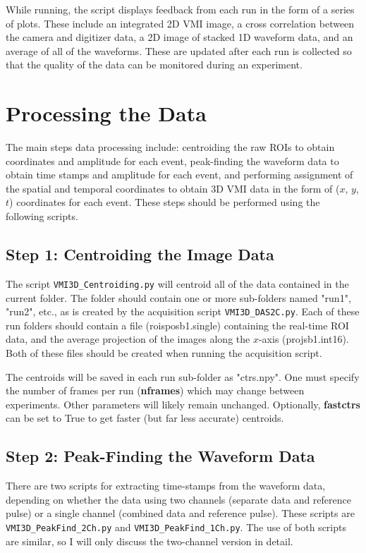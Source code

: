 \documentclass[12pt]{article}
\begin{document}
While running, the script displays feedback from each run in the form of a series of plots.
These include an integrated 2D VMI image, a cross correlation between the camera and digitizer data, a 2D image of stacked 1D waveform data, and an average of all of the waveforms.
These are updated after each run is collected so that the quality of the data can be monitored during an experiment.

\section{Processing the Data}

The main steps data processing include: centroiding the raw ROIs to obtain coordinates and amplitude for each event, peak-finding the waveform data to obtain time stamps and amplitude for each event, and performing assignment of the spatial and temporal coordinates to obtain 3D VMI data in the form of ($x$, $y$, $t$) coordinates for each event.
These steps should be performed using the following scripts.

\subsection{Step 1: Centroiding the Image Data}

The script \texttt{VMI3D\_Centroiding.py} will centroid all of the data contained in the current folder.
The folder should contain one or more sub-folders named "run1", "run2", etc., as is created by the acquisition script \texttt{VMI3D\_DAS2C.py}.
Each of these run folders should contain a file (roisposb1.single) containing the real-time ROI data, and the average projection of the images along the $x$-axis (projsb1.int16).
Both of these files should be created when running the acquisition script.

The centroids will be saved in each run sub-folder as "ctrs.npy".
One must specify the number of frames per run (\textbf{nframes}) which may change between experiments.
Other parameters will likely remain unchanged.
Optionally, \textbf{fastctrs} can be set to True to get faster (but far less accurate) centroids.

\subsection{Step 2: Peak-Finding the Waveform Data}

There are two scripts for extracting time-stamps from the waveform data, depending on whether the data using two channels (separate data and reference pulse) or a single channel (combined data and reference pulse).
These scripts are \texttt{VMI3D\_PeakFind\_2Ch.py} and \texttt{VMI3D\_PeakFind\_1Ch.py}.
The use of both scripts are similar, so I will only discuss the two-channel version in detail.
\end{document}
